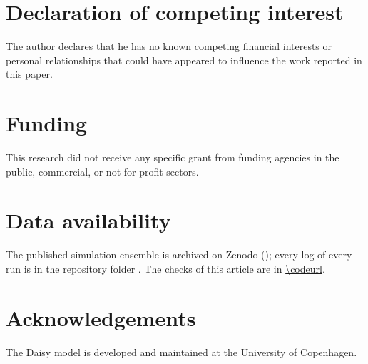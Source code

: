 \documentclass[preprint,12pt]{elsarticle}
\begin{document}
\section*{Declaration of competing interest}
The author declares that he has no known competing financial interests or personal relationships that could have appeared to influence the work reported in this paper.

\section*{Funding}
This research did not receive any specific grant from funding agencies in the public, commercial, or not-for-profit sectors.

\section*{Data availability}
The published simulation ensemble is archived on Zenodo (); every log of every run is in the repository folder \cslink{}. The checks of this article are in \url{\codeurl}.

\section*{Acknowledgements}
The Daisy model is developed and maintained at the University of Copenhagen.



\end{document}
